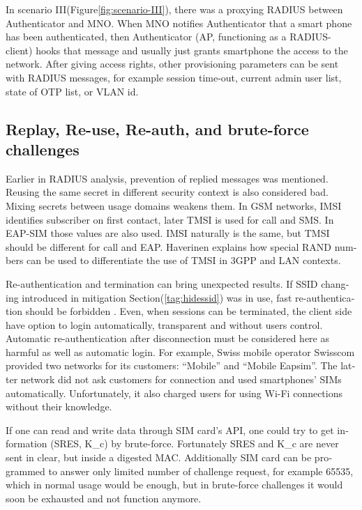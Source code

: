 \documentclass[12pt,a4paper,english]{tutthesis}
\begin{document}
\begin{otherlanguage}{english}
In scenario III(Figure\ref{fig:scenario-III}),  there was a proxying RADIUS between Authenticator
and MNO.  When MNO notifies Authenticator
that a smart phone has been authenticated, then Authenticator (AP, functioning
as a RADIUS-client) hooks that message and usually just grants
smartphone the access to the network. After giving access rights, other
provisioning parameters can be sent with RADIUS messages, for example
session time-out,
current admin user list, state of OTP list, or VLAN id.


\subsection{Replay, Re-use, Re-auth, and brute-force challenges}
\label{sec-6-5-5}
Earlier in RADIUS analysis, prevention of replied messages was
mentioned. Reusing the same secret in different security context is also
considered bad.  Mixing secrets between usage
domains weakens them.  In GSM networks, IMSI identifies subscriber on
first contact, later TMSI is used for call and SMS.  In EAP-SIM those
values are also used. IMSI naturally is the same, but TMSI should be
different for call and EAP.  Haverinen \cite{hav-doc} explains how
special RAND numbers can be used to differentiate the use of TMSI in 3GPP and LAN
contexts.

Re-authentication and termination can bring unexpected results.
If SSID changing introduced in mitigation Section(\ref{tag:hidessid}) was in use, fast re-authentication
should be forbidden \cite[p.11]{rfc5448}.
Even, when sessions can be terminated, the client side have 
option to login automatically, transparent and without users control.
Automatic re-authentication after disconnection  must be considered
here as harmful as well as automatic login. For example,
Swiss mobile operator Swisscom provided two networks for its customers:
``Mobile'' and ``Mobile Eapsim''. The latter network did not ask customers
for connection and used smartphones' SIMs automatically. Unfortunately,
it also charged users for using Wi-Fi connections without their 
knowledge. \cite{swisscom}





If one can read and write data through SIM card's API,
one could try to get information (SRES, K\_c) by brute-force. 
Fortunately SRES and K\_c are never sent in clear, but inside
a digested MAC.
 Additionally SIM card can be programmed to answer only
limited number of challenge request, for example 65535, which in
normal usage would be enough, but in brute-force challenges 
it would soon be exhausted and not function anymore.



\end{otherlanguage}
\end{document}
